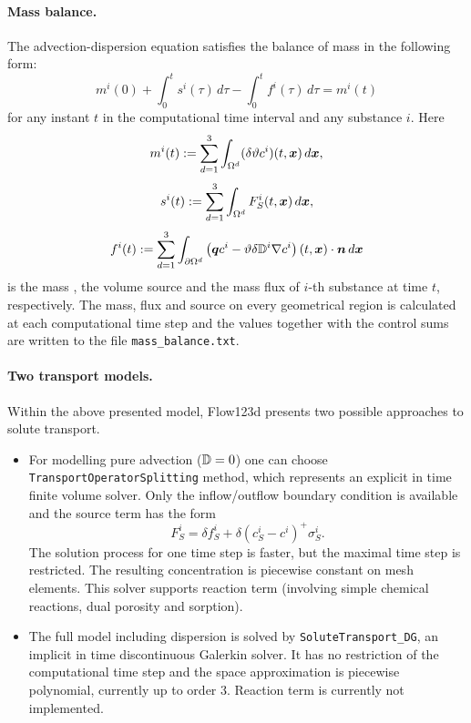 \paragraph{Mass balance.}
The advection-dispersion equation satisfies the balance of mass in the following form:
$$ m^i(0) + \int_0^t s^i(\tau) \,d\tau - \int_0^t f^i(\tau) \,d\tau = m^i(t) $$
for any instant $t$ in the computational time interval and any substance $i$.
Here
$$ m^i(t) := \sum_{d=1}^3\int_{\Omega^d}(\delta\vartheta c^i)(t,\mathbf{\boldsymbol{x}})\,d\mathbf{\boldsymbol{x}}, $$
$$ s^i(t) := \sum_{d=1}^3\int_{\Omega^d}F_S^i(t,\mathbf{\boldsymbol{x}})\,d\mathbf{\boldsymbol{x}}, $$
$$ f^i(t) := \sum_{d=1}^3\int_{\partial\Omega^d}\left(\mathbf{\boldsymbol{q}} c^i - \vartheta\delta{{\mathbb{D}}}^i\nabla c^i\right)(t,\mathbf{\boldsymbol{x}})\cdot\mathbf{\boldsymbol{n}} \,d\mathbf{\boldsymbol{x}} $$
is the mass , the volume source  and the mass flux  of $i$-th substance at time $t$, respectively.
The mass, flux and source on every geometrical region is calculated at each computational time step and the values together with the control sums are written to the file \texttt{mass\_balance.txt}.


\paragraph{Two transport models.}
Within the above presented model, Flow123d presents two possible approaches to solute transport.
\begin{itemize}
\item For modelling pure advection (${\mathbb{D}}=0$) one can choose {\tt TransportOperatorSplitting} method, which represents an explicit in time finite volume solver. 
Only the inflow/outflow boundary condition is available and the source term has the form
\[ F_S^i = \delta f_S^i + \delta(c_S^i-c^i)^+\sigma_S^i. \]
The solution process for one time step is faster, but the maximal time step is restricted. The resulting concentration is piecewise constant on mesh elements. This solver supports reaction term (involving simple chemical reactions, dual porosity and sorption).
\item The full model including dispersion is solved by {\tt SoluteTransport\_DG}, an implicit in time discontinuous Galerkin solver. It has no restriction of the computational time step and the space approximation is piecewise polynomial, currently up to order 3. Reaction term is currently not implemented.
\end{itemize}



